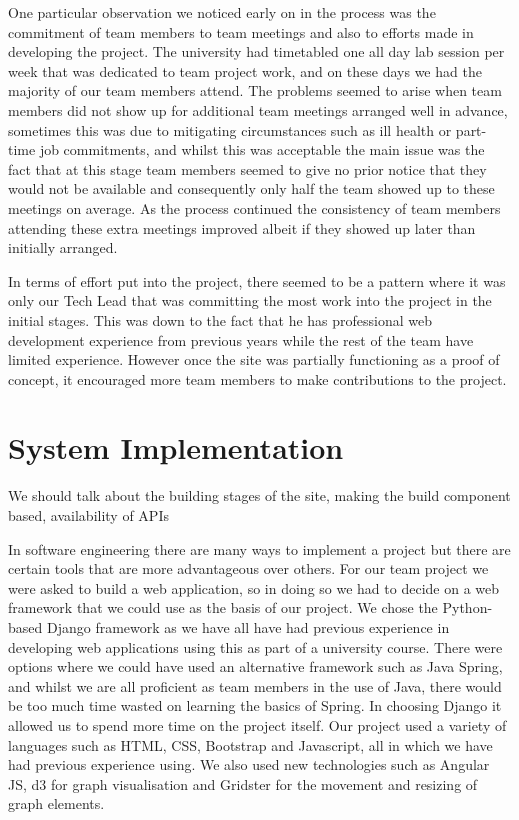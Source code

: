 \documentclass{l3proj}
\begin{document}
One particular observation we noticed early on in the process was the commitment of team members to team meetings and also
to efforts made in developing the project. The university had timetabled one all day lab session per week that was dedicated
to team project work, and on these days we had the majority of our team members attend. The problems seemed to arise when
team members did not show up for additional team meetings arranged well in advance, sometimes this was due to mitigating
circumstances such as ill health or part-time job commitments, and whilst this was acceptable the main issue was the fact
that at this stage team members seemed to give no prior notice that they would not be available and consequently only
half the team showed up to these meetings on average. As the process continued the consistency of team members attending these
extra meetings improved albeit if they showed up later than initially arranged.

In terms of effort put into the project, there seemed to be a pattern where it was only our Tech Lead that was committing the most
work into the project in the initial stages. This was down to the fact that he has professional web development experience from previous
years while the rest of the team have limited experience. However once the site was partially functioning as a proof of concept, it
encouraged more team members to make contributions to the project.



\section{System Implementation}
\label{implementation}

We should talk about the building stages of the site, making the build component based, availability of APIs

In software engineering there are many ways to implement a project but there are certain tools that are more advantageous over
others. For our team project we were asked to build a web application, so in doing so we had to decide on a web framework that
we could use as the basis of our project. We chose the Python-based Django framework as we have all have had previous experience
in developing web applications using this as part of a university course. There were options where we could have used an alternative
framework such as Java Spring, and whilst we are all proficient as team members in the use of Java, there would be too much time
wasted on learning the basics of Spring. In choosing Django it allowed us to spend more time on the project itself. Our project
used a variety of languages such as HTML, CSS, Bootstrap and Javascript, all in which we have had previous experience using.
We also used new technologies such as Angular JS, d3 for graph visualisation and Gridster for the movement and resizing of graph
elements.
\end{document}

